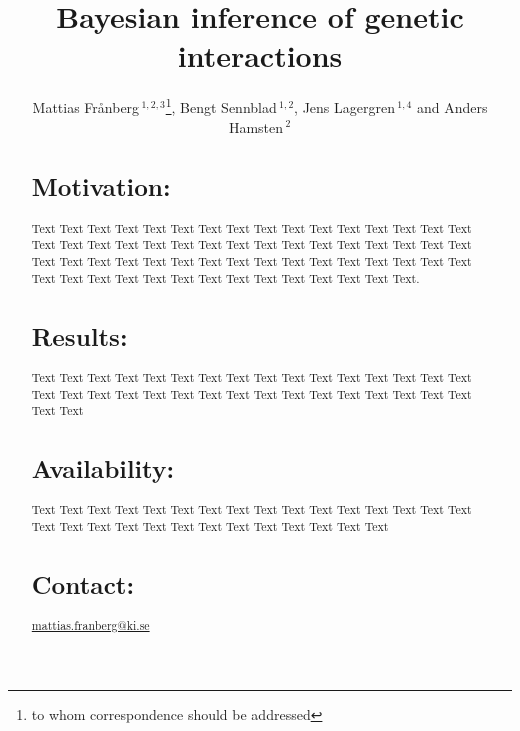\documentclass{bioinfo}
\begin{document}

\title[Bayesian inference of genetic interactions]{Bayesian inference of genetic interactions}
\author[F\aa berg \textit{et~al}]{Mattias Fr\aa nberg\,$^{1,2,3}$\footnote{to whom correspondence should be addressed}, Bengt Sennblad\,$^{1,2}$, Jens Lagergren\,$^{1,4}$ and Anders Hamsten\,$^2$}
\address{$^{1}$Science for Life Laboratory, Stockholm University, SE-17121, Solna\\
$^{2}$Atherosclerosis Research Unit, Department of Medicine, Karolinska Institutet, SE-171 77, Stockholm,\\
$^{3}$Department of Numerical Analysis and Computer Science, Stockholm University, SE-100 44, Stockholm,\\
$^{4}$School of Computer Science and Communications, KTH Royal Institute of Technology, SE-100 44, Stockholm, Sweden}



\maketitle

\begin{abstract}

\section{Motivation:}
Text Text Text  Text Text Text Text Text Text Text Text
Text  Text Text Text Text Text Text Text Text Text  Text Text Text Text Text Text Text Text Text  Text Text Text Text Text Text Text Text Text  Text Text Text Text Text Text Text Text Text  Text Text Text Text Text Text Text Text Text  Text Text Text Text Text.

\section{Results:}
Text  Text Text Text Text Text Text Text Text Text  Text Text Text Text Text Text Text Text Text  Text Text Text Text Text Text Text Text Text  Text Text Text Text Text Text

\section{Availability:}
Text  Text Text Text Text Text Text Text Text Text  Text Text Text Text Text Text Text Text Text  Text Text Text Text Text Text Text Text Text  Text

\section{Contact:} \href{mattias.franberg@ki.se}{mattias.franberg@ki.se}
\end{abstract}
\end{document}
